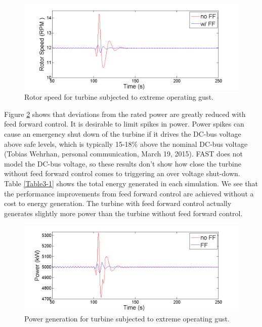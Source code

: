 \begin{figure}[htbp]
	\centering
		\includegraphics[width = \linewidth]{Figures/ch3Figures/fig3-14.png}
		
	\caption{Rotor speed for turbine subjected to extreme operating gust. }
	\label{fig3-14}
\end{figure}

Figure \ref{fig3-15} shows that deviations from the rated power are greatly reduced with feed forward control. It is desirable to limit spikes in power. Power spikes can cause an emergency shut down of the turbine if it drives the DC-bus voltage above safe levels, which is typically 15-18$\%$ above the nominal DC-bus voltage (Tobias Wehrhan, personal communication, March 19, 2015). FAST does not model the DC-bus voltage, so these results don't show how close the turbine without feed forward control comes to triggering an over voltage shut-down. Table \ref{Table3-1} shows the total energy generated in each simulation. We see that the performance improvements from feed forward control are achieved without a cost to energy generation. The turbine with feed forward control actually generates slightly more power than the turbine without feed forward control.


\begin{figure}[htbp]
	\centering
		\includegraphics[width = \linewidth]{Figures/ch3Figures/fig3-15.png}
		
	\caption{Power generation for turbine subjected to extreme operating gust.}
	\label{fig3-15}
\end{figure}

